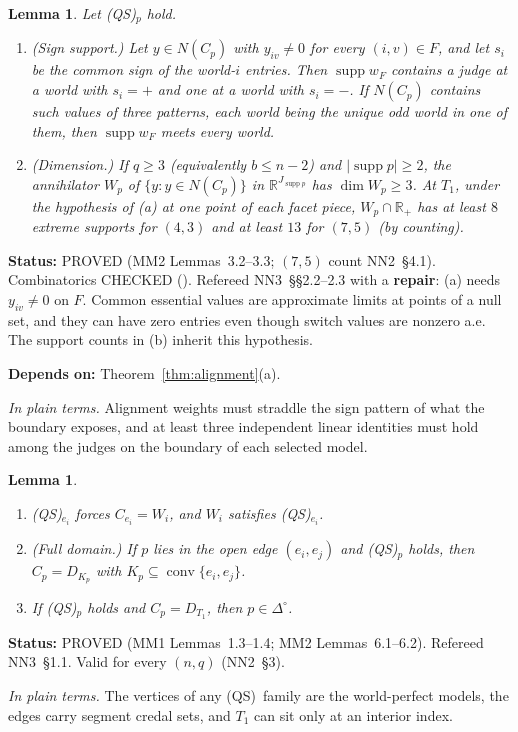 \documentclass[11pt]{article}
\newtheorem{lemma}[theorem]{Lemma}
\theoremstyle{definition}
\theoremstyle{remark}
\newcommand{\R}{\mathbb R}
\newcommand{\Di}{\Delta^{\circ}}
\newcommand{\co}{\operatorname{conv}}
\newcommand{\supp}{\operatorname{supp}}
\newcommand{\src}[1]{\textsf{#1}}
\newcommand{\status}[1]{\par\smallskip\noindent\textbf{Status:} #1\par}
\newcommand{\deps}[1]{\noindent\textbf{Depends on:} #1\par}
\newcommand{\inwords}[1]{\noindent\textit{In plain terms.} #1\par\smallskip}
\newcommand{\QS}{\textup{(QS)}}
\begin{document}
\begin{lemma}\label{lem:sign-dim}
Let \QS$_p$ hold.
\begin{enumerate}[label=(\alph*)]
\item \emph{(Sign support.)} Let $y\in N(C_p)$ with $y_{iv}\ne0$ for every $(i,v)\in F$, and let $s_i$ be the common sign of the world-$i$ entries. Then $\supp w_F$ contains a judge at a world with $s_i=+$ and one at a world with $s_i=-$. If $N(C_p)$ contains such values of three patterns, each world being the unique odd world in one of them, then $\supp w_F$ meets every world.
\item \emph{(Dimension.)} If $q\ge3$ (equivalently $b\le n-2$) and $|\supp p|\ge2$, the annihilator $W_p$ of $\{y:y\in N(C_p)\}$ in $\R^{J_{\supp p}}$ has $\dim W_p\ge3$. At $T_1$, under the hypothesis of (a) at one point of each facet piece, $W_p\cap\R_+$ has at least $8$ extreme supports for $(4,3)$ and at least $13$ for $(7,5)$ (by counting).
\end{enumerate}
\end{lemma}
\status{PROVED (\src{MM2} Lemmas~3.2--3.3; $(7,5)$ count \src{NN2}~\S4.1). Combinatorics CHECKED (\file{mm2py/branch_comb.out}). Refereed \src{NN3}~\S\S2.2--2.3 with a \textbf{repair}: (a) needs $y_{iv}\ne0$ on $F$. Common essential values are approximate limits at points of a null set, and they can have zero entries even though switch values are nonzero a.e. The support counts in (b) inherit this hypothesis.}
\deps{Theorem~\ref{thm:alignment}(a).}
\inwords{Alignment weights must straddle the sign pattern of what the boundary exposes, and at least three independent linear identities must hold among the judges on the boundary of each selected model.}

\begin{lemma}\label{lem:vertices-edges}
\begin{enumerate}[label=(\alph*)]
\item \QS$_{e_i}$ forces $C_{e_i}=W_i$, and $W_i$ satisfies \QS$_{e_i}$.
\item (Full domain.) If $p$ lies in the open edge $(e_i,e_j)$ and \QS$_p$ holds, then $C_p=D_{K_p}$ with $K_p\subseteq\co\{e_i,e_j\}$.
\item If \QS$_p$ holds and $C_p=D_{T_1}$, then $p\in\Di$.
\end{enumerate}
\end{lemma}
\status{PROVED (\src{MM1} Lemmas~1.3--1.4; \src{MM2} Lemmas~6.1--6.2). Refereed \src{NN3}~\S1.1. Valid for every $(n,q)$ (\src{NN2}~\S3).}
\inwords{The vertices of any \QS\ family are the world-perfect models, the edges carry segment credal sets, and $T_1$ can sit only at an interior index.}
\end{document}
